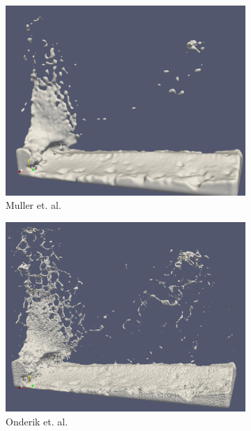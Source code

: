 \begin{figure}
	\begin{center}
		\begin{subfigure}[b]{0.48\textwidth}
			\includegraphics[width=\textwidth]{figures/MullerEtAlForRelWork.png}
			\caption{Muller et. al.}
		\end{subfigure}
		\begin{subfigure}[b]{0.48\textwidth}
			\includegraphics[width=\textwidth]{figures/OnderikEtAlForRelWork.png}
			\caption{Onderik et. al.}
		\end{subfigure}
		\begin{subfigure}[b]{0.48\textwidth}

\end{subfigure}
\end{center}
\end{figure}
